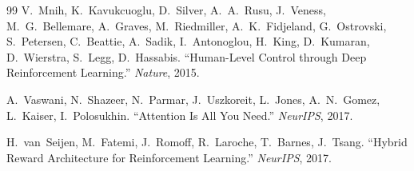 \documentclass[11pt,a4paper]{article}
\theoremstyle{definition}
\begin{document}
\begin{thebibliography}{99}
V.~Mnih, K.~Kavukcuoglu, D.~Silver, A.~A.~Rusu, J.~Veness, M.~G.~Bellemare, A.~Graves, M.~Riedmiller, A.~K.~Fidjeland, G.~Ostrovski, S.~Petersen, C.~Beattie, A.~Sadik, I.~Antonoglou, H.~King, D.~Kumaran, D.~Wierstra, S.~Legg, D.~Hassabis.
``Human-Level Control through Deep Reinforcement Learning.''
\textit{Nature}, 2015.

A.~Vaswani, N.~Shazeer, N.~Parmar, J.~Uszkoreit, L.~Jones, A.~N.~Gomez, L.~Kaiser, I.~Polosukhin.
``Attention Is All You Need.''
\textit{NeurIPS}, 2017.

H.~van~Seijen, M.~Fatemi, J.~Romoff, R.~Laroche, T.~Barnes, J.~Tsang.
``Hybrid Reward Architecture for Reinforcement Learning.''
\textit{NeurIPS}, 2017.

\end{thebibliography}
\end{document}
